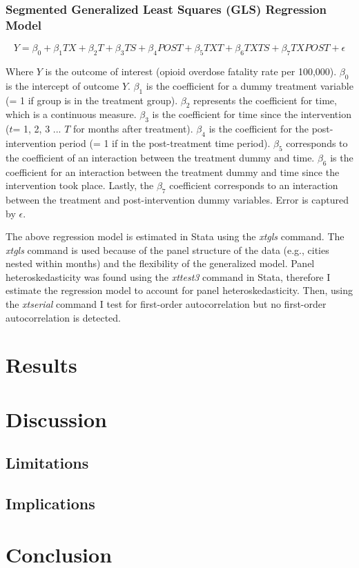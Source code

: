 \subsubsection{Segmented Generalized Least Squares (GLS) Regression Model}

\[Y = \beta_0 + \beta_1 TX + \beta_2 T + \beta_3 TS + \beta_4 POST + \beta_5 TXT + \beta_6 TXTS + \beta_7 TXPOST + \epsilon \]

Where \(Y\) is the outcome of interest (opioid overdose fatality rate per 100,000). \(\beta_0\) is the intercept of outcome \(Y\). \(\beta_1\) is the coefficient for a dummy treatment variable (= 1 if group is in the treatment group). \(\beta_2\) represents the coefficient for time, which is a continuous measure. \(\beta_3\) is the coefficient for time since the intervention (\(t\)= 1, 2, 3 ... \(T\) for months after treatment). \(\beta_4\) is the coefficient for the post-intervention period (= 1 if in the post-treatment time period).  \(\beta_5\) corresponds to the coefficient of an interaction between the treatment dummy and time. \(\beta_6\) is the coefficient for an interaction between the treatment dummy and time since the intervention took place. Lastly, the \(\beta_7\) coefficient corresponds to an interaction between the treatment and post-intervention dummy variables. Error is captured by \(\epsilon\).

The above regression model is estimated in Stata \parencite{statacorp_stata_2023} using the \textit{xtgls} command. The \textit{xtgls} command is used because of the panel structure of the data (e.g., cities nested within months) and the flexibility of the generalized model. Panel heteroskedasticity was found using the \textit{xttest3} command in Stata, therefore I estimate the regression model to account for panel heteroskedasticity. Then, using the \textit{xtserial} command I test for first-order autocorrelation but no first-order autocorrelation is detected.  

\section{Results}

\section{Discussion}
\subsection{Limitations}
\subsection{Implications}
\section{Conclusion}
